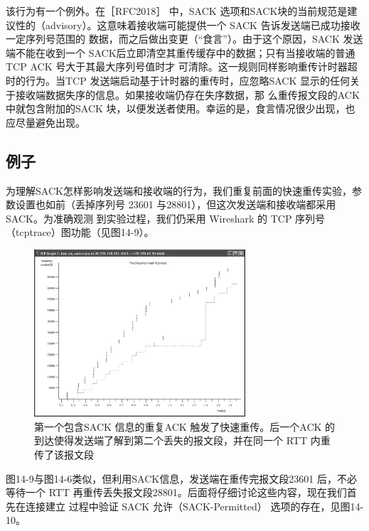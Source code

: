 该行为有一个例外。在［RFC2018］ 中，SACK 选项和SACK块的当前规范是建议性的（advisory）。这意味着接收端可能提供一个 SACK 告诉发送端已成功接收一定序列号范围的
数据，而之后做出变更（“食言”）。由于这个原因，SACK 发送端不能在收到一个 SACK后立即清空其重传缓存中的数据；只有当接收端的普通TCP ACK 号大于其最大序列号值时才
可清除。这一规则同样影响重传计时器超时的行为。当TCP 发送端启动基于计时器的重传时，应忽略SACK 显示的任何关于接收端数据失序的信息。如果接收端仍存在失序数据，那
么重传报文段的ACK 中就包含附加的SACK 块，以便发送者使用。幸运的是，食言情况很少出现，也应尽量避免出现。

\subsection{例子}
为理解SACK怎样影响发送端和接收端的行为，我们重复前面的快速重传实验，参数设置也如前（丢掉序列号 23601 与28801），但这次发送端和接收端都采用SACK。为准确观测
到实验过程，我们仍采用 Wireshark 的 TCP 序列号（tcptrace）图功能（见图14-9）。
\begin{figure}[!htb]
    \centering
	\includegraphics[width=0.7\textwidth]{imgs/14/14-9.png}
	\caption{第一个包含SACK 信息的重复ACK 触发了快速重传。后一个ACK 的到达使得发送端了解到第二个丢失的报文段，并在同一个 RTT 内重传了该报文段}
\end{figure}

图14-9与图14-6类似，但利用SACK信息，发送端在重传完报文段23601 后，不必等待一个 RTT 再重传丢失报文段28801。后面将仔细讨论这些内容，现在我们首先在连接建立
过程中验证 SACK 允许（SACK-Permitted） 选项的存在，见图14-10。

